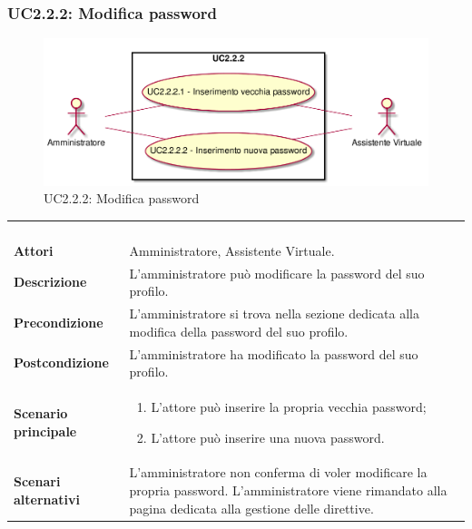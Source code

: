 \newpage\subsubsection{UC2.2.2: Modifica password}
\label{UC2.2.2}
\begin{figure}[h]
\centering
\includegraphics[width=\textwidth,height=\textheight,keepaspectratio]{images/UseCaseUC222.png}
\caption{UC2.2.2: Modifica password}
\end{figure}
\begin{longtable}{l|p{10cm}}
\rowcolor[gray]{0.8} \multicolumn{2}{c}{} \\
\rowcolor[gray]{0.8} \multicolumn{2}{c}{\textbf{UC2.2.2 - Modifica password}} \\
\rowcolor[gray]{0.8} \multicolumn{2}{c}{} \\
\hline
&\\
\textbf{Attori} & Amministratore, Assistente Virtuale.\\[7pt]
\textbf{Descrizione} & L'amministratore può modificare la password del suo profilo.\\[7pt]
\textbf{Precondizione} & L'amministratore si trova nella sezione dedicata alla modifica della password del suo profilo.\\[7pt]
\textbf{Postcondizione} & L'amministratore ha modificato la password del suo profilo.\\[7pt]
\textbf{Scenario principale} &\begin{enumerate}
\item  L'attore può inserire la propria vecchia password;
\item  L'attore può inserire una nuova password.
\end{enumerate}
\\[7pt]
\textbf{Scenari alternativi} & L'amministratore non conferma di voler modificare la propria password. L'amministratore viene rimandato alla pagina dedicata alla gestione delle direttive.\\[7pt]\hline
\end{longtable}

